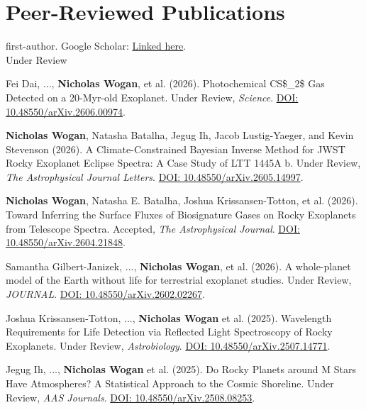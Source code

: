 \documentclass[12pt]{article}
\begin{document}
\section{Peer-Reviewed Publications}

 first-author. Google Scholar: \href{https://scholar.google.com/citations?hl=en&user=BExg34IAAAAJ}{Linked here}. \\

\noindent Under Review

\begin{cvlist}
\item[2026]
  Fei Dai, ..., \textbf{Nicholas Wogan}, et al. (2026). Photochemical CS\$\_2\$ Gas Detected on a 20-Myr-old Exoplanet. Under Review, \emph{Science}. \href{https://doi.org/10.48550/arXiv.2606.00974}{DOI: 10.48550/arXiv.2606.00974}.
\item[2026]
  \textbf{Nicholas Wogan}, Natasha Batalha, Jegug Ih, Jacob Lustig-Yaeger, and Kevin Stevenson (2026). A Climate-Constrained Bayesian Inverse Method for JWST Rocky Exoplanet Eclipse Spectra: A Case Study of LTT 1445A b. Under Review, \emph{The Astrophysical Journal Letters}. \href{https://doi.org/10.48550/arXiv.2605.14997}{DOI: 10.48550/arXiv.2605.14997}.
\item[2026]
  \textbf{Nicholas Wogan}, Natasha E. Batalha, Joshua Krissansen-Totton, et al. (2026). Toward Inferring the Surface Fluxes of Biosignature Gases on Rocky Exoplanets from Telescope Spectra. Accepted, \emph{The Astrophysical Journal}. \href{https://doi.org/10.48550/arXiv.2604.21848}{DOI: 10.48550/arXiv.2604.21848}.
\item[2026]
  Samantha Gilbert-Janizek, ..., \textbf{Nicholas Wogan}, et al. (2026). A whole-planet model of the Earth without life for terrestrial exoplanet studies. Under Review, \emph{JOURNAL}. \href{https://doi.org/10.48550/arXiv.2602.02267}{DOI: 10.48550/arXiv.2602.02267}.
\item[2025]
  Joshua Krissansen-Totton, ..., \textbf{Nicholas Wogan} et al. (2025). Wavelength Requirements for Life Detection via Reflected Light Spectroscopy of Rocky Exoplanets. Under Review, \emph{Astrobiology}. \href{https://doi.org/10.48550/arXiv.2507.14771}{DOI: 10.48550/arXiv.2507.14771}.
\item[2025]
  Jegug Ih, ..., \textbf{Nicholas Wogan} et al. (2025). Do Rocky Planets around M Stars Have Atmospheres? A Statistical Approach to the Cosmic Shoreline. Under Review, \emph{AAS Journals}. \href{https://doi.org/10.48550/arXiv.2508.08253}{DOI: 10.48550/arXiv.2508.08253}.

\end{cvlist}
\end{document}

